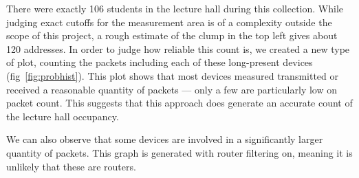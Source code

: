 There were exactly 106 students in the lecture hall during this collection.
While judging exact cutoffs for the measurement area is of a complexity outside the scope of this project, a rough estimate of the clump in the top left gives about 120 addresses.
In order to judge how reliable this count is, we created a new type of plot, counting the packets including each of these long-present devices (fig~\ref{fig:probhist}).
This plot shows that most devices measured transmitted or received a reasonable quantity of packets --- only a few are particularly low on packet count.
This suggests that this approach does generate an accurate count of the lecture hall occupancy.

We can also observe that some devices are involved in a significantly larger quantity of packets.
This graph is generated with router filtering on, meaning it is unlikely that these are routers.
